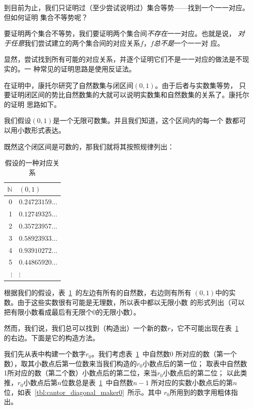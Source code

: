 到目前为止，我们只证明过（至少尝试说明过）集合等势——找到一个一一对应。但如何证明
集合不等势呢？

要证明两个集合不等势，我们要证明两个集合间\emph{不存在}一一对应。也就是说，
\emph{对于任意}我们尝试建立的两个集合间的对应关系$f$，$f$\emph{总不是}一个一一对
应。

显然，尝试找到所有可能的对应关系，并逐个证明它们不是一一对应的做法是不现实的。一
种常见的证明思路是使用反证法。%

在证明中，康托尔研究了自然数集与闭区间$\left( 0,1\right) $。由于后者与实数集等势，
只要证明闭区间的势比自然数集的大就可以说明实数集和自然数集的关系了。康托尔的证明
思路如下。

我们假设$\left( 0,1 \right) $是一个无限可数集。并且我们知道，这个区间内的每一个
数都可以用小数形式表达。

既然这个闭区间是可数的，那我们就将其按照规律列出：

\begin{table}[H]
    \centering
    \caption{假设的一种对应关系}\label{tbl:cantor_diagonal}
    \begin{tabular}{r|l}
        $\mathbb{N}$& $\left( 0,1 \right) $\\
        \hline
        0 & $0.24723159\ldots $\\
        1 & $0.12749325\ldots $\\
        2 & $0.35723957\ldots $\\
        3 & $0.58923933\ldots $\\
        4 & $0.93910272\ldots $\\
        5 & $0.44865920\ldots $\\
        $\vdots$ & $\vdots$
    \end{tabular}
\end{table}

根据我们的假设，表~\ref{tbl:cantor_diagonal}~的左边有所有的自然数，右边则有所有
$\left( 0,1 \right) $中的实数。由于这些实数很有可能是无理数，所以表中都以无限小数
的形式列出（可以把有限小数看成最后有无限个0的无限小数）。

然而，我们说，我们总可以找到（构造出）一个新的数$r$，它不可能出现在表~\ref{tbl:cantor_diagonal}~%
的右边。下面是它的构造方法。

我们先从表中构建一个数字$r_{0}$。我们考虑表~\ref{tbl:cantor_diagonal}~中自然数0
所对应的数（第一个数），取其小数点后第一位数来当我们构造的$r_{0}$小数点后的第一位；
取表中自然数1所对应的数（第二个数）小数点后的第二位，来当$r_{0}$小数点后的第二位；
以此类推，$r_{0}$小数点后第$n$位数总是表~\ref{tbl:cantor_diagonal}~中自然数$n-1$
所对应的实数小数点后的第$n$位，如表~\ref{tbl:cantor_diagonal_maker0}~所示。其中
$r_{0}$所用到的数字用粗体指出。

